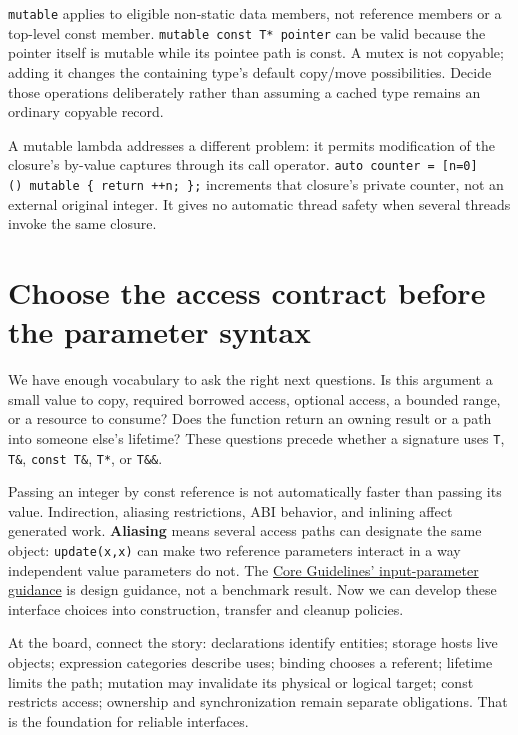 \texttt{mutable} applies to eligible non-static data members, not reference members or a top-level const member. \texttt{mutable\ const\ T*\ pointer} can be valid because the pointer itself is mutable while its pointee path is const. A mutex is not copyable; adding it changes the containing type's default copy/move possibilities. Decide those operations deliberately rather than assuming a cached type remains an ordinary copyable record.

A mutable lambda addresses a different problem: it permits modification of the closure's by-value captures through its call operator. \texttt{auto\ counter\ =\ {[}n=0{]}()\ mutable\ \{\ return\ ++n;\ \};} increments that closure's private counter, not an external original integer. It gives no automatic thread safety when several threads invoke the same closure.

\section{Choose the access contract before the parameter syntax}\label{05-engine-i-ch003-choose-the-access-contract-before-the-parameter-syntax}

We have enough vocabulary to ask the right next questions. Is this argument a small value to copy, required borrowed access, optional access, a bounded range, or a resource to consume? Does the function return an owning result or a path into someone else's lifetime? These questions precede whether a signature uses \texttt{T}, \texttt{T\&}, \texttt{const\ T\&}, \texttt{T*}, or \texttt{T\&\&}.

Passing an integer by const reference is not automatically faster than passing its value. Indirection, aliasing restrictions, ABI behavior, and inlining affect generated work. \textbf{Aliasing} means several access paths can designate the same object: \texttt{update(x,x)} can make two reference parameters interact in a way independent value parameters do not. The \href{https://isocpp.github.io/CppCoreGuidelines/CppCoreGuidelines\#f16-for-in-parameters-pass-cheaply-copied-types-by-value-and-others-by-reference-to-const}{Core Guidelines' input-parameter guidance} is design guidance, not a benchmark result. Now we can develop these interface choices into construction, transfer and cleanup policies.

At the board, connect the story: declarations identify entities; storage hosts live objects; expression categories describe uses; binding chooses a referent; lifetime limits the path; mutation may invalidate its physical or logical target; const restricts access; ownership and synchronization remain separate obligations. That is the foundation for reliable interfaces.

